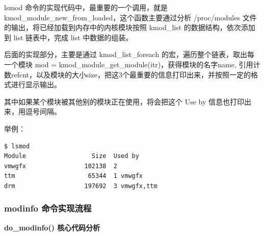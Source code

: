 \documentclass[11pt,a4paper]{article}
\begin{document}
lsmod 命令的实现代码中，最重要的一个调用，就是
kmod\_module\_new\_from\_loaded，这个函数主要通过分析 /proc/modules
文件的输出，将已经加载到内存中的内核模块按照 kmod\_list
的数据结构，依次添加到 list 链表中，完成 list 中数据的组装。

后面的实现部分，主要是通过 kmod\_list\_foreach
的宏，遍历整个链表，取出每一个模块 mod =
kmod\_module\_get\_module(itr)，获得模块的名字name,
引用计数refcnt，以及模块的大小size，把这3个最重要的信息打印出来，并按照一定的格式进行显示输出。

其中如果某个模块被其他别的模块正在使用，将会把这个 Use by
信息也打印出来，用逗号间隔。

举例：

{\begin{shaded}\begin{verbatim}
$ lsmod
Module                  Size  Used by
vmwgfx                102138  2 
ttm                    65344  1 vmwgfx
drm                   197692  3 vmwgfx,ttm
\end{verbatim}\end{shaded}}
\subsubsection{modinfo 命令实现流程}

\textbf{do\_modinfo() 核心代码分析}
\end{document}
